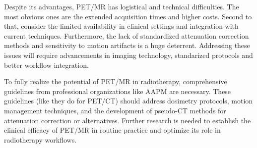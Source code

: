 


Despite its advantages, PET/MR has logistical and technical difficulties. The most obvious ones are the extended acquisition times and higher costs. Second to that, consider the limited availability in clinical settings and integration with current techniques. Furthermore, the lack of standardized attenuation correction methods and sensitivity to motion artifacts is a huge deterrent. Addressing these issues will require advancements in imaging technology, standarized protocols and better workflow integration.\cite{pichler2008,Prakken2023}

To fully realize the potential of PET/MR in radiotherapy, comprehensive guidelines from professional organizations like AAPM are necessary. These guidelines (like they do for PET/CT) should address dosimetry protocols, motion management techniques, and the development of pseudo-CT methods for attenuation correction or alternatives. Further research is needed to establish the clinical efficacy of PET/MR in routine practice and optimize its role in radiotherapy workflows.
